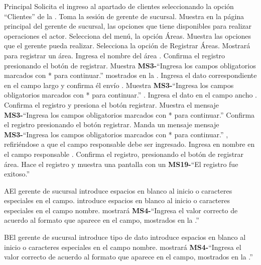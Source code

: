	\begin{UCtrayectoria}{Principal}
		\UCpaso[\UCactor] Solicita el ingreso al apartado de clientes seleccionando la opción ``Clientes'' de la .
		\UCpaso Toma la sesión de gerente de sucursal.
		\UCpaso Muestra en la página principal del gerente de sucursal, las opciones que tiene disponibles para realizar operaciones el actor. 
		\UCpaso[\UCactor] Selecciona del menú, la opción Áreas.
		\UCpaso Muestra las opciones que el gerente pueda realizar.
		\UCpaso[\UCactor] Selecciona la opción de Registrar Áreas.
		\UCpaso Mostrará   para registrar un área.
		\UCpaso[\UCactor] Ingresa el nombre del área .
		\UCpaso[\UCactor] Confirma el registro presionando el botón de registrar.
		\UCpaso Muestra {\bf MS3-}``Ingresa los campos obligatorios marcados con * para continuar.''  mostrados en la  .
		\UCpaso[\UCactor] Ingresa el dato correspondiente en el campo largo y confirma él envío .
		\UCpaso Muestra {\bf MS3-}``Ingresa los campos obligatorios marcados con * para continuar.'' .
		\UCpaso[\UCactor] Ingresa el dato en el campo ancho .
		\UCpaso[\UCactor] Confirma el registro y presiona el botón registrar.
		\UCpaso Muestra el mensaje {\bf MS3-}``Ingresa los campos obligatorios marcados con * para continuar.''
		\UCpaso[\UCactor] Confirma el registro presionando el botón registrar.
		\UCpaso Manda un mensaje mensaje {\bf MS3-}``Ingresa los campos obligatorios marcados con * para continuar.'' , refiriéndose a  que el campo responsable debe ser ingresado.
		\UCpaso[\UCactor] Ingresa en nombre en el campo responsable .
		\UCpaso[\UCactor] Confirma el registro, presionando el botón de registrar área.
		\UCpaso Hace el registro y muestra una pantalla con un {\bf MS19-}``El registro fue exitoso.''
	\end{UCtrayectoria}
		
		\begin{UCtrayectoriaA}{A}{El gerente de sucursal introduce espacios en blanco al inicio o caracteres especiales en el campo.}
			\UCpaso[\UCactor] introduce espacios en blanco al inicio o caracteres especiales en el campo nombre.
			\UCpaso mostrará {\bf MS4-}``Ingresa el valor correcto de acuerdo al formato que aparece en el campo, mostrados en la .''
		\end{UCtrayectoriaA}

		\begin{UCtrayectoriaA}{B}{El gerente de sucursal introduce tipo de dato }
			\UCpaso[\UCactor] introduce espacios en blanco al inicio o caracteres especiales en el campo nombre.
			\UCpaso mostrará {\bf MS4-}``Ingresa el valor correcto de acuerdo al formato que aparece en el campo, mostrados en la .''
		\end{UCtrayectoriaA}